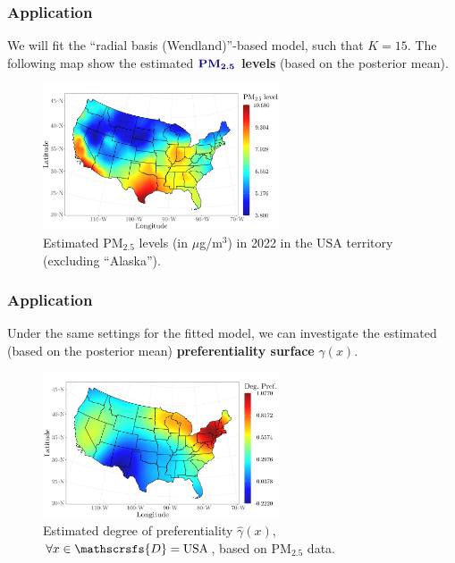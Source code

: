 \documentclass[10pt, aspectratio = 169, handout]{beamer} %
\let\oldtextbf\textbf
\renewcommand\textbf[1]{\textcolor{titles}{\oldtextbf{#1}}}
\begin{document}
     \begin{frame}[t]
        \frametitle{Application}
		\justifying

        We will fit the ``radial basis (Wendland)''-based model, such that $K = 15$. The following map show the estimated $\textbf{PM}_{\textbf{2.5}}$ \textbf{levels} (based on the posterior mean).

        \vspace{-6pt}

        \begin{figure}[!ht]
        	\centering
        	\includegraphics[width = 0.625\textwidth]{Images/usa_pm25.jpeg} \vspace{-6pt}
            \caption{\justifying Estimated $\text{PM}_{2.5}$ levels (in $\mu$g/m${}^3$) in 2022 in the $\text{USA}$ territory (excluding ``Alaska'').}
        	\label{fig:usa_pm25}
        \end{figure}

	\end{frame}

    \begin{frame}[t]
        \frametitle{Application}
		\justifying

        Under the same settings for the fitted model, we can investigate the estimated (based on the posterior mean) \textbf{preferentiality surface} $\gamma(x)$.

        \vspace{-6pt}

        \begin{figure}[!ht]
        	\centering
        	\includegraphics[width = 0.625\textwidth]{Images/preferentiality.jpeg} \vspace{-6pt}
            \caption{\justifying Estimated degree of preferentiality $\hat{\gamma}(x)$, $\forall x \in \mathscrsfs{D} = \text{USA}$, based on $\text{PM}_{2.5}$ data.}
        	\label{fig:preferentiality_usa}
        \end{figure}
    
	\end{frame}
\end{document}
